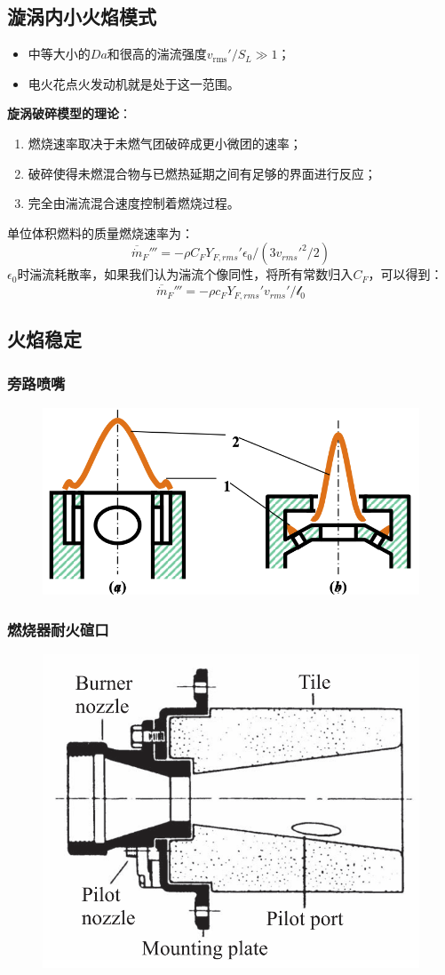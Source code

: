 \subsection{漩涡内小火焰模式}
\begin{itemize}
    \item 中等大小的\(Da\)和很高的湍流强度\(v_\mathrm{rms}'/S_L\gg 1\)；
    \item 电火花点火发动机就是处于这一范围。
\end{itemize}

\textbf{旋涡破碎模型的理论}：
\begin{enumerate}
    \item 燃烧速率取决于未燃气团破碎成更小微团的速率；
    \item 破碎使得未燃混合物与已燃热延期之间有足够的界面进行反应；
    \item 完全由湍流混合速度控制着燃烧过程。
\end{enumerate}

单位体积燃料的质量燃烧速率为：
\begin{equation}
    \overline{\dot{m}}_F''' = -\rho C_F Y_{F, rms}' \epsilon_0 / (3 v_{rms}'^2 / 2)
\end{equation}\(\epsilon_0\)时湍流耗散率，如果我们认为湍流个像同性，将所有常数归入\(C_F\)，可以得到：
\begin{equation}
    \overline{\dot{m}}_F''' = -\rho c_F Y_{F,rms}' v_{rms}' / \mathcal{l}_0
\end{equation}

\subsection{火焰稳定}

\subsubsection{旁路喷嘴}
\begin{figure}[H]
    \includegraphics[width=.3\textwidth]{img/zhiban.png}
\end{figure}
\subsubsection{燃烧器耐火碹口}
\begin{figure}[H]
    \centering
    \includegraphics[width=.3\textwidth]{img/tiles.png}
\end{figure}

